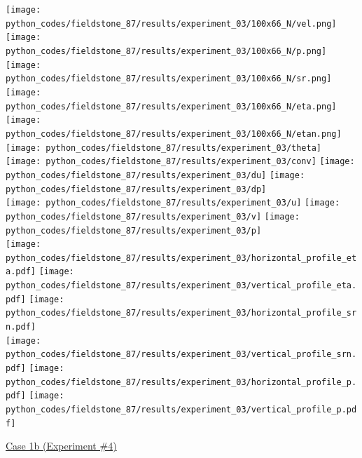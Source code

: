\begin{center}
\texttt{[image: python\_codes/fieldstone\_87/results/experiment\_03/100x66\_N/vel.png]}
\texttt{[image: python\_codes/fieldstone\_87/results/experiment\_03/100x66\_N/p.png]}
\texttt{[image: python\_codes/fieldstone\_87/results/experiment\_03/100x66\_N/sr.png]}\\
\texttt{[image: python\_codes/fieldstone\_87/results/experiment\_03/100x66\_N/eta.png]}
\texttt{[image: python\_codes/fieldstone\_87/results/experiment\_03/100x66\_N/etan.png]}
\texttt{[image: python\_codes/fieldstone\_87/results/experiment\_03/theta]}\\
\texttt{[image: python\_codes/fieldstone\_87/results/experiment\_03/conv]}
\texttt{[image: python\_codes/fieldstone\_87/results/experiment\_03/du]}
\texttt{[image: python\_codes/fieldstone\_87/results/experiment\_03/dp]}\\
\texttt{[image: python\_codes/fieldstone\_87/results/experiment\_03/u]}
\texttt{[image: python\_codes/fieldstone\_87/results/experiment\_03/v]}
\texttt{[image: python\_codes/fieldstone\_87/results/experiment\_03/p]}\\
\texttt{[image: python\_codes/fieldstone\_87/results/experiment\_03/horizontal\_profile\_eta.pdf]}
\texttt{[image: python\_codes/fieldstone\_87/results/experiment\_03/vertical\_profile\_eta.pdf]}
\texttt{[image: python\_codes/fieldstone\_87/results/experiment\_03/horizontal\_profile\_srn.pdf]}\\
\texttt{[image: python\_codes/fieldstone\_87/results/experiment\_03/vertical\_profile\_srn.pdf]}
\texttt{[image: python\_codes/fieldstone\_87/results/experiment\_03/horizontal\_profile\_p.pdf]}
\texttt{[image: python\_codes/fieldstone\_87/results/experiment\_03/vertical\_profile\_p.pdf]}\\
\end{center}


\newpage
\underline{Case 1b (Experiment \#4)}

